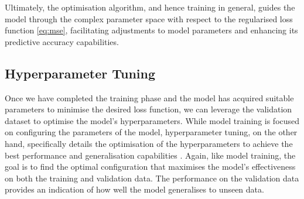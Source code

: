 Ultimately, the optimisation algorithm, and hence training in general, guides the model through the complex parameter space with respect to the regularised loss function \ref{eq:mse}, facilitating adjustments to model parameters and enhancing its predictive accuracy capabilities.


\subsection{Hyperparameter Tuning}
\label{subsec:4 Hyperparameter Tuning}

Once we have completed the training phase and the model has acquired suitable parameters to minimise the desired loss function, we can leverage the validation dataset to optimise the model's hyperparameters. While model training is focused on configuring the parameters of the model, hyperparameter tuning, on the other hand, specifically details the optimisation of the hyperparameters to achieve the best performance and generalisation capabilities \cite{diaz2017effective}. Again, like model training, the goal is to find the optimal configuration that maximises the model's effectiveness on both the training and validation data. The performance on the validation data provides an indication of how well the model generalises to unseen data. 

